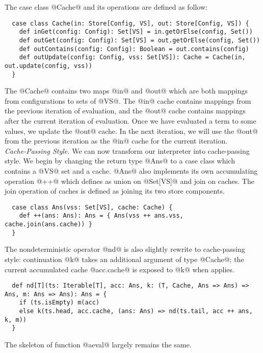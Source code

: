 \documentclass[acmsmall, review]{acmart}\settopmatter{}
\begin{document}
The case class @Cache@ and its operations are defined as follow:

\begin{lstlisting}
  case class Cache(in: Store[Config, VS], out: Store[Config, VS]) {
    def inGet(config: Config): Set[VS] = in.getOrElse(config, Set())
    def outGet(config: Config): Set[VS] = out.getOrElse(config, Set())
    def outContains(config: Config): Boolean = out.contains(config)
    def outUpdate(config: Config, vss: Set[VS]): Cache = Cache(in, out.update(config, vss))
  }
\end{lstlisting}

The @Cache@ contains two maps @in@ and @out@ which are both mappings from configurations 
to sets of @VS@. The @in@ cache contains mappings from the previous iteration of evaluation, 
and the @out@ cache contains mappings after the current iteration of evaluation. 
Once we have evaluated a term to some values, we update the @out@ cache. In the next 
iteration, we will use the @out@ from the previous iteration as the @in@ cache for the 
current iteration. \\

\textit{Cache-Passing Style.}
We can now transform our interpreter into cache-passing style. We begin by changing the 
return type @Ans@ to a case class which contains a @VS@ set and a cache. @Ans@ also implements 
its own accumulating operation @++@ which defines as union on @Set[VS]@ and join on caches.
The join operation of caches is defined as joining its two store components.

\begin{lstlisting}
  case class Ans(vss: Set[VS], cache: Cache) {
    def ++(ans: Ans): Ans = { Ans(vss ++ ans.vss, cache.join(ans.cache)) }
  }
\end{lstlisting}

The nondeterministic operator @nd@ is also slightly rewrite to cache-passing style:
continuation @k@ takes an additional argument of type @Cache@; the current accumulated
cache @acc.cache@ is exposed to @k@ when applies.

\begin{lstlisting}
  def nd[T](ts: Iterable[T], acc: Ans, k: (T, Cache, Ans => Ans) => Ans, m: Ans => Ans): Ans = {
    if (ts.isEmpty) m(acc)
    else k(ts.head, acc.cache, (ans: Ans) => nd(ts.tail, acc ++ ans, k, m))
  }
\end{lstlisting}

The skeleton of function @aeval@ largely remains the same. 
\end{document}
